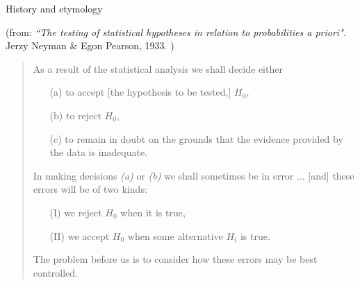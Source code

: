 \begin{frame}{History and etymology}

  (from: \textit{``The testing of statistical hypotheses in relation to probabilities a priori".} Jerzy Neyman \& Egon Pearson, 1933. )

    \vspace{2em}

  \begin{quote}
    As a result of the statistical analysis we shall decide either
    \begin{itemize}
        \item[(a)] to accept [the hypothesis to be tested,] $H_0$, 
        \item[(b)] to reject $H_0$, 
        \item[(c)] to remain in doubt 
          on the grounds that the evidence provided by the data is inadequate.
    \end{itemize}
    In making decisions \textit{(a)} or \textit{(b)}
    we shall sometimes be in error
    ... [and] these errors will be of two kinds:
    \begin{itemize}
      \item[(I)] we reject $H_0$ when it is true,
      \item[(II)] we accept $H_0$ when some alternative $H_i$ is true.
    \end{itemize}
    The problem before us is to consider how these errors may be best controlled.
  \end{quote}


\end{frame}

